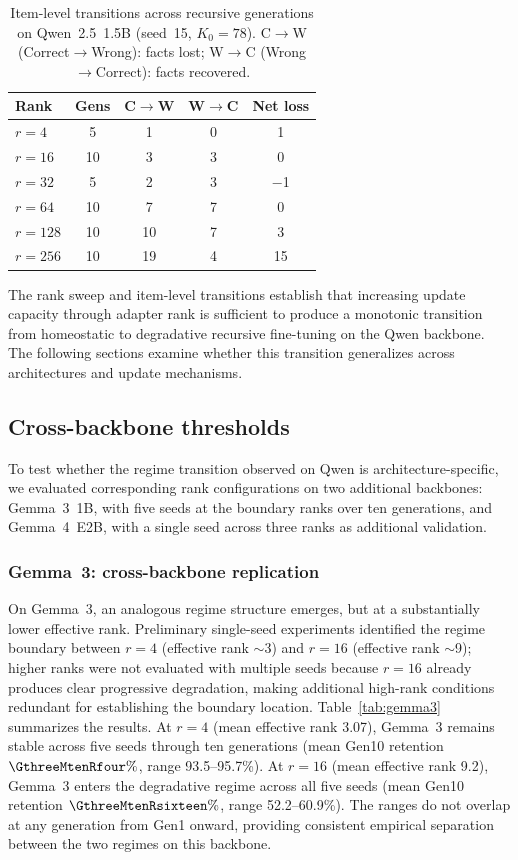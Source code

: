 \documentclass[a4paper,fleqn]{cas-dc}
\newif\ifshowchanges
\newcommand{\rev}[1]{\ifshowchanges{\color{blue}#1}\else{#1}\fi}
\renewcommand{\arraystretch}{1.8}
\begin{document}
\begin{table}[htbp]
\caption{Item-level transitions across recursive generations on
Qwen~2.5~1.5B (seed~15, $K_0 = 78$). C$\to$W (Correct$\to$Wrong): facts lost;
W$\to$C (Wrong$\to$Correct): facts recovered.}\label{tab:transitions}
\footnotesize
\renewcommand{\arraystretch}{1.4}
\begin{tabular}{@{}lcccc@{}}
\toprule
Rank & Gens & C$\to$W & W$\to$C & Net loss \\
\midrule
$r=4$   & 5  & 1  & 0 & 1 \\
$r=16$  & 10 & 3  & 3 & 0 \\
$r=32$  & 5  & 2  & 3 & $-$1 \\
$r=64$  & 10 & 7  & 7 & 0 \\
$r=128$ & 10 & 10 & 7 & 3 \\
$r=256$ & 10 & 19 & 4 & 15 \\
\bottomrule
\end{tabular}
\end{table}

The rank sweep and item-level transitions establish that increasing update
capacity through adapter rank is sufficient to produce a monotonic transition
from homeostatic to degradative recursive fine-tuning on the Qwen backbone. The
following sections examine whether this transition generalizes across
architectures and update mechanisms.

\subsection{Cross-backbone thresholds}\label{sec:res_backbone}

To test whether the regime transition observed on Qwen is architecture-specific,
we evaluated corresponding rank configurations on two additional backbones:
Gemma~3~1B, with five seeds at the boundary ranks over ten generations, and
Gemma~4~E2B, with a single seed across three ranks as additional validation.

\subsubsection{Gemma~3: cross-backbone replication}

On Gemma~3, an analogous regime structure emerges, but at a substantially lower
effective rank. Preliminary single-seed experiments identified the regime
boundary between $r=4$ (effective rank ${\sim}$3) and $r=16$ (effective rank
${\sim}$9); higher ranks were not evaluated with multiple seeds because $r=16$
already produces clear progressive degradation, making additional high-rank
conditions redundant for establishing the boundary location.
Table~\ref{tab:gemma3} summarizes the results. At $r=4$ (mean
effective rank 3.07), Gemma~3 remains stable across five seeds through ten
generations (mean Gen10 retention \rev{$\GthreeMtenRfour\%$, range 93.5--95.7\%}).
At $r=16$ (mean effective rank 9.2), Gemma~3 enters the degradative regime
across all five seeds (mean Gen10 retention \rev{$\GthreeMtenRsixteen\%$,
range 52.2--60.9\%}). The ranges do not
overlap at any generation from Gen1 onward, providing consistent empirical
separation between the two regimes on this backbone.
\end{document}
